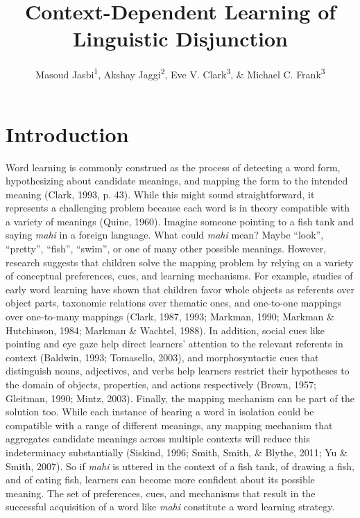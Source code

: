 \documentclass[
  ,man,floatsintext]{apa6}
\title{Context-Dependent Learning of Linguistic Disjunction}
\author{Masoud Jasbi\textsuperscript{1}, Akshay Jaggi\textsuperscript{2}, Eve V. Clark\textsuperscript{3}, \& Michael C. Frank\textsuperscript{3}}
\date{}
\affiliation{\vspace{0.5cm}\textsuperscript{1} University of California, Davis\\\textsuperscript{2} Harvard Medical School\\\textsuperscript{3} Stanford University}
\begin{document}
\maketitle

\hypertarget{introduction}{%
\section{Introduction}\label{introduction}}

Word learning is commonly construed as the process of detecting a word form, hypothesizing about candidate meanings, and mapping the form to the intended meaning (Clark, 1993, p. 43). While this might sound straightforward, it represents a challenging problem because each word is in theory compatible with a variety of meanings (Quine, 1960). Imagine someone pointing to a fish tank and saying \emph{mahi} in a foreign language. What could \emph{mahi} mean? Maybe ``look'', ``pretty'', ``fish'', ``swim'', or one of many other possible meanings. However, research suggests that children solve the mapping problem by relying on a variety of conceptual preferences, cues, and learning mechanisms. For example, studies of early word learning have shown that children favor whole objects as referents over object parts, taxonomic relations over thematic ones, and one-to-one mappings over one-to-many mappings (Clark, 1987, 1993; Markman, 1990; Markman \& Hutchinson, 1984; Markman \& Wachtel, 1988). In addition, social cues like pointing and eye gaze help direct learners' attention to the relevant referents in context (Baldwin, 1993; Tomasello, 2003), and morphosyntactic cues that distinguish nouns, adjectives, and verbs help learners restrict their hypotheses to the domain of objects, properties, and actions respectively (Brown, 1957; Gleitman, 1990; Mintz, 2003). Finally, the mapping mechanism can be part of the solution too. While each instance of hearing a word in isolation could be compatible with a range of different meanings, any mapping mechanism that aggregates candidate meanings across multiple contexts will reduce this indeterminacy substantially (Siskind, 1996; Smith, Smith, \& Blythe, 2011; Yu \& Smith, 2007). So if \emph{mahi} is uttered in the context of a fish tank, of drawing a fish, and of eating fish, learners can become more confident about its possible meaning. The set of preferences, cues, and mechanisms that result in the successful acquisition of a word like \emph{mahi} constitute a word learning strategy.
\end{document}
